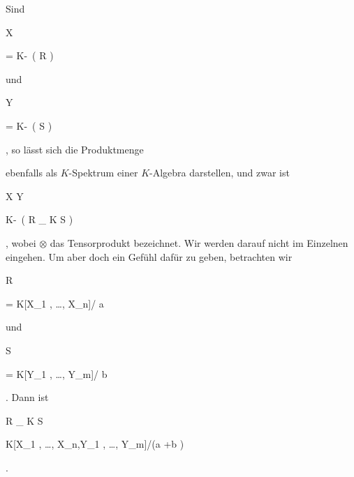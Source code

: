 {
Sind


\mavergleichskette

{\vergleichskette

{ X
}

{ = }{ K\!-\!\, \left(   R   \right)
}

{  }{
}

{    }{
}

{   }{
}

}
{}{}{}
und


\mavergleichskette

{\vergleichskette

{ Y
}

{ = }{ K\!-\!\, \left(   S   \right)
}

{  }{
}

{    }{
}

{   }{
}

}
{}{}{,}
so  lässt sich die Produktmenge

 ebenfalls als $K$-Spektrum einer $K$-Algebra darstellen, und zwar ist


\mavergleichskettedisp

{\vergleichskette

{ X \times Y
}

{ \cong} { K\!-\!\, \left(   R \otimes_{ K } S  \right)
}

{ } {
}

{ } {
}

{ } {
}

}
{}{}{,}
wobei $\otimes$ das Tensorprodukt bezeichnet. Wir werden darauf nicht im Einzelnen eingehen. Um aber doch ein Gefühl dafür zu geben, betrachten wir


\mavergleichskette

{\vergleichskette

{ R
}

{ = }{ K[X_1 , \ldots , X_n]/ {\mathfrak a}
}

{  }{
}

{    }{
}

{   }{
}

}
{}{}{}
und


\mavergleichskette

{\vergleichskette

{ S
}

{ = }{ K[Y_1 , \ldots ,  Y_m]/  {\mathfrak b}
}

{  }{
}

{    }{
}

{   }{
}

}
{}{}{.}
Dann ist


\mavergleichskettedisp

{\vergleichskette

{ R \otimes_{ K } S
}

{ \cong} { K[X_1  , \ldots ,  X_n,Y_1 , \ldots , Y_m]/({\mathfrak a} +{\mathfrak b} )
}

{ } {
}

{ } {
}

{ } {
}

}
{}{}{}
 {} {.}
}
